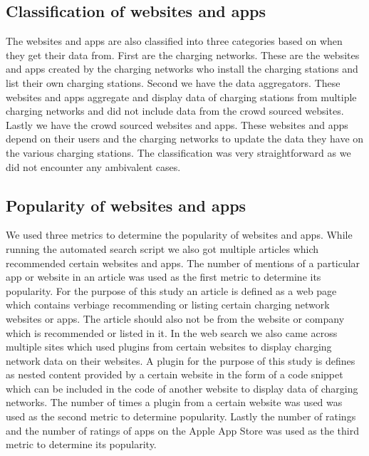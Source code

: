 \documentclass[conference]{IEEEtran}
\begin{document}
\subsection{Classification of websites and apps}
The websites and apps are also classified into three categories based on when they get their data from. First are the charging networks. These are the websites and apps created by the charging networks who install the charging stations and list their own charging stations. Second we have the data aggregators. These websites and apps aggregate and display data of charging stations from multiple charging networks and did not include data from the crowd sourced websites. Lastly we have the crowd sourced websites and apps. These websites and apps depend on their users and the charging networks to update the data they have on the various charging stations. The classification was very straightforward as we did not encounter any ambivalent cases. 

\subsection{Popularity of websites and apps}
We used three metrics to determine the popularity of websites and apps. While running the automated search script we also got multiple articles which recommended certain websites and apps. The number of mentions of a particular app or website in an article was used as the first metric to determine its popularity. For the purpose of this study an article is defined as a web page which contains verbiage recommending or listing certain charging network websites or apps. The article should also not be from the website or company which is recommended or listed in it. In the web search we also came across multiple sites which used plugins from certain websites to display charging network data on their websites. A plugin for the purpose of this study is defines as nested content provided by a certain website in the form of a code snippet which can be included in the code of another website to display data of charging networks. The number of times a plugin from a certain website was used was used as the second metric to determine popularity. Lastly the number of ratings and the number of ratings of apps on the Apple App Store was used as the third metric to determine its popularity.
\end{document}

